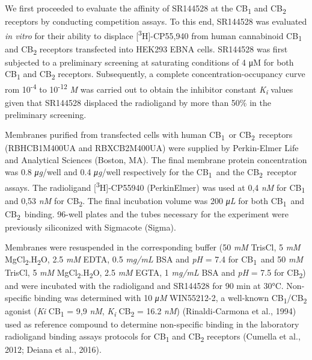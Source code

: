 \documentclass[empirical, authordate, issue]{jote-new-article}
\begin{document}
We first proceeded to evaluate the affinity of SR144528 at the CB\textsubscript{1} and CB\textsubscript{2} receptors by conducting competition assays. To this end, SR144528 was evaluated \emph{in vitro} for their ability to displace [\textsuperscript{3}H]-CP55,940 from human cannabinoid CB\textsubscript{1 }and CB\textsubscript{2} receptors transfected into HEK293 EBNA cells. SR144528 was first subjected to a preliminary screening at saturating conditions of 4 μM for both CB\textsubscript{1} and CB\textsubscript{2} receptors. Subsequently, a complete concentration-occupancy curve rom 10\textsuperscript{-4} to 10\textsuperscript{-12 }\emph{M} was carried out to obtain the inhibitor constant \emph{K}\textsubscript{\emph{i}} values given that SR144528 displaced the radioligand by more than 50\% in the preliminary screening.

Membranes purified from transfected cells with human CB\textsubscript{1} or CB\textsubscript{2} receptors (RBHCB1M400UA and RBXCB2M400UA) were supplied by Perkin-Elmer Life and Analytical Sciences (Boston, MA). The final membrane protein concentration was 0.8 \emph{μg}/well and 0.4 \emph{μg}/well respectively for the CB\textsubscript{1} and the CB\textsubscript{2} receptor assays. The radioligand [\textsuperscript{3}H]-CP55940 (PerkinElmer) was used at 0,4 \emph{nM} for CB\textsubscript{1} and 0,53 \emph{nM }for CB\textsubscript{2}. The final incubation volume was 200 \emph{μ}\emph{L} for both CB\textsubscript{1} and CB\textsubscript{2} binding. 96-well plates and the tubes necessary for the experiment were previously siliconized with Sigmacote (Sigma).

Membranes were resuspended in the corresponding buffer (50 \emph{mM} TrisCl, 5 \emph{mM} MgCl\textsubscript{2}.H\textsubscript{2}O, 2.5 \emph{mM} EDTA, 0.5 \emph{mg/mL} BSA and \emph{pH} = 7.4 for CB\textsubscript{1} and 50 \emph{mM} TrisCl, 5 \emph{mM} MgCl\textsubscript{2}.H\textsubscript{2}O, 2.5 \emph{mM} EGTA, 1 \emph{mg/mL }BSA and \emph{pH} = 7.5 for CB\textsubscript{2}) and were incubated with the radioligand and SR144528 for 90 min at 30°C. Non-specific binding was determined with 10 \emph{μ}\emph{M} WIN55212-2, a well-known CB\textsubscript{1}/CB\textsubscript{2} agonist (\emph{Ki} CB\textsubscript{1} = 9,9 \emph{nM}, \emph{K\textsubscript{i}} CB\textsubscript{2} = 16.2 \emph{nM}) (Rinaldi-Carmona et al., 1994) used as reference compound to determine non-specific binding in the laboratory radioligand binding assays protocols for CB\textsubscript{1} and CB\textsubscript{2} receptors (Cumella et al., 2012; Deiana et al., 2016).
\end{document}
